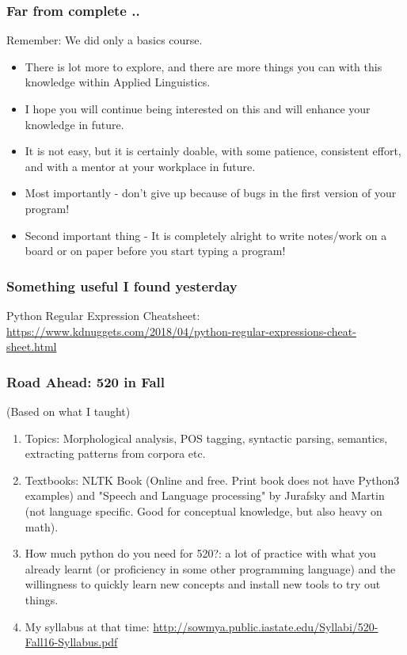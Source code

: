 \documentclass{beamer}
\begin{document}
\begin{frame}
\frametitle{Far from complete ..}
Remember: We did only a basics course.
\begin{itemize}
\item There is lot more to explore, and there are more things you can with this knowledge within Applied Linguistics.
\item I hope you will continue being interested on this and will enhance your knowledge in future.
\item It is not easy, but it is certainly doable, with some patience, consistent effort, and with a mentor at your workplace in future.
\item Most importantly - don't give up because of bugs in the first version of your program!
\item Second important thing - It is completely alright to write notes/work on a board or on paper before you start typing a program!
\end{itemize}
\end{frame}

\begin{frame}
\frametitle{Something useful I found yesterday}
Python Regular Expression Cheatsheet:  \\ \small
\url{https://www.kdnuggets.com/2018/04/python-regular-expressions-cheat-sheet.html}
\end{frame}

\begin{frame}
\frametitle{Road Ahead: 520 in Fall}
(Based on what I taught)
\begin{enumerate}
\item Topics: Morphological analysis, POS tagging, syntactic parsing, semantics, extracting patterns from corpora etc.
\item Textbooks: NLTK Book (Online and free. Print book does not have Python3 examples) and "Speech and Language processing" by Jurafsky and Martin (not language specific. Good for conceptual knowledge, but also heavy on math). 
\item How much python do you need for 520?: a lot of practice with what you already learnt (or proficiency in some other programming language) and the willingness to quickly learn new concepts and install new tools to try out things.
\item My syllabus at that time: \small \url{http://sowmya.public.iastate.edu/Syllabi/520-Fall16-Syllabus.pdf}
\end{enumerate}
\end{frame}
\end{document}
